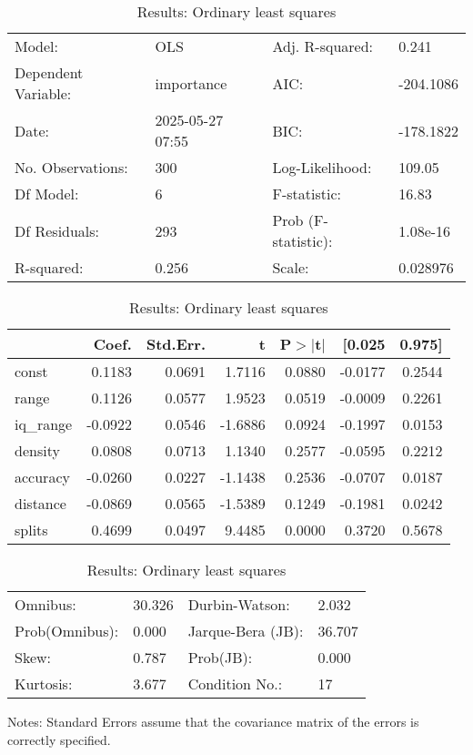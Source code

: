\begin{table}
\caption{Results: Ordinary least squares}
\label{}
\begin{center}
\begin{tabular}{llll}
\hline
Model:              & OLS              & Adj. R-squared:     & 0.241      \\
Dependent Variable: & importance       & AIC:                & -204.1086  \\
Date:               & 2025-05-27 07:55 & BIC:                & -178.1822  \\
No. Observations:   & 300              & Log-Likelihood:     & 109.05     \\
Df Model:           & 6                & F-statistic:        & 16.83      \\
Df Residuals:       & 293              & Prob (F-statistic): & 1.08e-16   \\
R-squared:          & 0.256            & Scale:              & 0.028976   \\
\hline
\end{tabular}
\end{center}

\begin{center}
\begin{tabular}{lrrrrrr}
\hline
          &   Coef. & Std.Err. &       t & P$> |$t$|$ &  [0.025 & 0.975]  \\
\hline
const     &  0.1183 &   0.0691 &  1.7116 &      0.0880 & -0.0177 & 0.2544  \\
range     &  0.1126 &   0.0577 &  1.9523 &      0.0519 & -0.0009 & 0.2261  \\
iq\_range & -0.0922 &   0.0546 & -1.6886 &      0.0924 & -0.1997 & 0.0153  \\
density   &  0.0808 &   0.0713 &  1.1340 &      0.2577 & -0.0595 & 0.2212  \\
accuracy  & -0.0260 &   0.0227 & -1.1438 &      0.2536 & -0.0707 & 0.0187  \\
distance  & -0.0869 &   0.0565 & -1.5389 &      0.1249 & -0.1981 & 0.0242  \\
splits    &  0.4699 &   0.0497 &  9.4485 &      0.0000 &  0.3720 & 0.5678  \\
\hline
\end{tabular}
\end{center}

\begin{center}
\begin{tabular}{llll}
\hline
Omnibus:       & 30.326 & Durbin-Watson:    & 2.032   \\
Prob(Omnibus): & 0.000  & Jarque-Bera (JB): & 36.707  \\
Skew:          & 0.787  & Prob(JB):         & 0.000   \\
Kurtosis:      & 3.677  & Condition No.:    & 17      \\
\hline
\end{tabular}
\end{center}
\end{table}
\bigskip
Notes: \newline 
[1] Standard Errors assume that the covariance matrix of the errors is correctly specified.